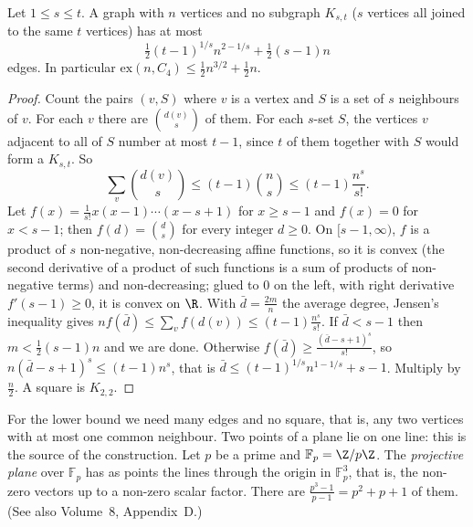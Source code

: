 \begin{theorem}\label{extremal:thm:kst}
Let $1\le s\le t$. A graph with $n$ vertices and no subgraph $K_{s,t}$ ($s$ vertices all joined to the same $t$ vertices) has at most
\[
\tfrac12(t-1)^{1/s}n^{2-1/s}+\tfrac12(s-1)n
\]
edges. In particular $\mathrm{ex}(n,C_4)\le\frac12n^{3/2}+\frac12n$.
\end{theorem}
\begin{proof}
Count the pairs $(v,S)$ where $v$ is a vertex and $S$ is a set of $s$ neighbours of $v$. For each $v$ there are $\binom{d(v)}s$ of them. For each $s$-set $S$, the
vertices $v$ adjacent to all of $S$ number at most $t-1$, since $t$ of them together with $S$ would form a $K_{s,t}$. So
\[
\sum_v\binom{d(v)}s\le(t-1)\binom ns\le(t-1)\frac{n^s}{s!}.
\]
Let $f(x)=\frac1{s!}x(x-1)\cdots(x-s+1)$ for $x\ge s-1$ and $f(x)=0$ for $x<s-1$; then $f(d)=\binom ds$ for every integer $d\ge0$. On $[s-1,\infty)$, $f$ is a product of
$s$ non-negative, non-decreasing affine functions, so it is convex (the second derivative of a product of such functions is a sum of products of
non-negative terms) and non-decreasing; glued to $0$ on the left, with right derivative $f'(s-1)\ge0$, it is convex on $\R$. With $\bar d=\frac{2m}n$ the
average degree, Jensen's inequality gives $nf(\bar d)\le\sum_vf(d(v))\le(t-1)\frac{n^s}{s!}$. If $\bar d<s-1$ then $m<\frac12(s-1)n$ and we are done. Otherwise
$f(\bar d)\ge\frac{(\bar d-s+1)^s}{s!}$, so $n(\bar d-s+1)^s\le(t-1)n^s$, that is $\bar d\le(t-1)^{1/s}n^{1-1/s}+s-1$. Multiply by $\frac n2$. A square is $K_{2,2}$.
\end{proof}

For the lower bound we need many edges and no square, that is, any two vertices with at most one common neighbour. Two points of a plane
lie on one line: this is the source of the construction. Let $p$ be a prime and $\mathbb F_p=\Z/p\Z$. The \emph{projective plane} over $\mathbb F_p$ has as
points the lines through the origin in $\mathbb F_p^3$, that is, the non-zero vectors up to a non-zero scalar factor. There are $\frac{p^3-1}{p-1}=p^2+p+1$
of them. (See also Volume~8, Appendix~D.)

